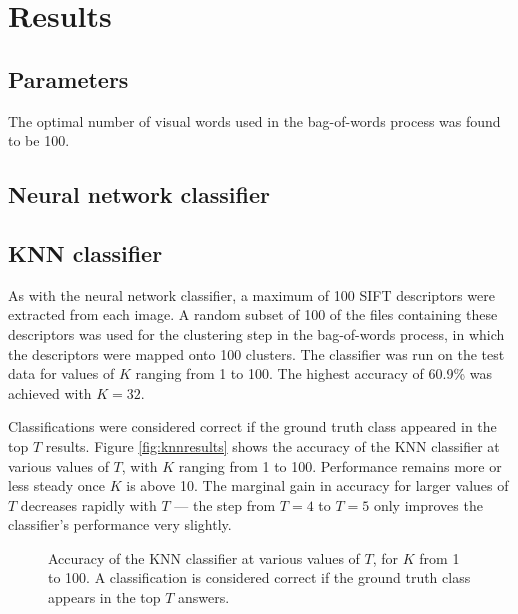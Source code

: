 \section{Results}

\subsection{Parameters}
The optimal number of visual words used in the bag-of-words process was found to be 100.


\subsection{Neural network classifier}

\subsection{KNN classifier}
As with the neural network classifier, a maximum of 100 SIFT descriptors were extracted from each image.
A random subset of 100 of the files containing these descriptors was used for the clustering step in the bag-of-words process, in which the descriptors were mapped onto 100 clusters.
The classifier was run on the test data for values of $K$ ranging from 1 to 100.
The highest accuracy of 60.9\% was achieved with $K = 32$.

Classifications were considered correct if the ground truth class appeared in the top $T$ results.
Figure \vref{fig:knnresults} shows the accuracy of the KNN classifier at various values of $T$, with $K$ ranging from 1 to 100.
Performance remains more or less steady once $K$ is above 10.
The marginal gain in accuracy for larger values of $T$ decreases rapidly with $T$ --- the step from $T=4$ to $T=5$ only improves the classifier's performance very slightly.


\begin{figure}[htb]
	\centering
	\caption{Accuracy of the KNN classifier at various values of $T$, for $K$ from 1 to 100. A classification is considered correct if the ground truth class appears in the top $T$ answers.}
	\label{fig:knnresults}
\end{figure}
